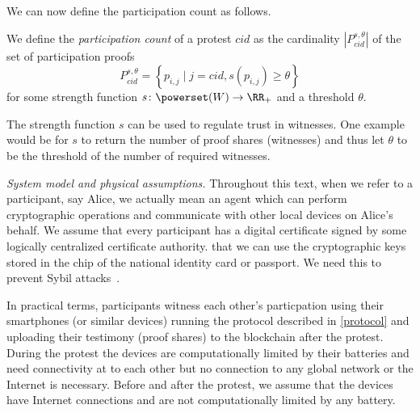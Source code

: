 We can now define the participation count as follows.
\begin{definition}
  We define the \emph{participation count} of a protest \(cid\) as the cardinality \(|P_{cid}^{s,\theta}|\) of the set of participation proofs \[
    P_{cid}^{s,\theta} = \left\{ p_{i,j} \mid
      j = cid, s(p_{i,j})\geq \theta \right\}
  \] for some strength function \(s\colon \powerset(W)\to \RR_+\) and a 
  threshold \(\theta\).
\end{definition}
The strength function \(s\) can be used to regulate trust in witnesses.
One example would be for \(s\) to return the number of proof shares (\ie witnesses) and thus let \(\theta\) to be the threshold of the number of required witnesses.

\emph{System model and physical assumptions.} \label{assumptions}
Throughout this text, when we refer to a participant, say Alice, we actually 
mean an agent which can perform cryptographic operations and communicate with 
other local devices on Alice's behalf. We assume that every participant has a digital certificate signed by 
some logically centralized certificate authority.
\Eg that we can use the cryptographic keys stored in the chip of the national 
identity card or passport.
We need this to prevent Sybil attacks~\cite{SybilAttack}.

In practical terms, participants witness each other's particpation
using their smartphones (or similar devices) running the protocol described in
\cref{protocol} and uploading their testimony (\ie proof shares) to the blockchain after the protest. 
During the protest the devices are computationally limited by their 
batteries and need connectivity at to each other but no connection to
any global network or the Internet is necessary. Before and
after the protest, we assume that the devices have Internet  
connections and are not computationally limited by any battery.











